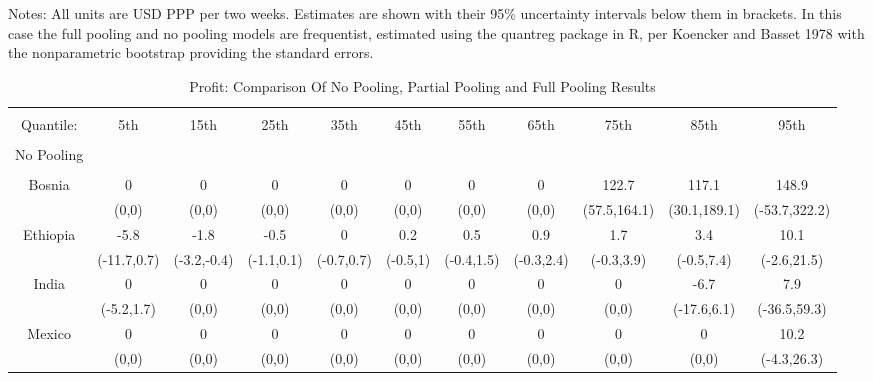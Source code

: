 \documentclass[AER]{AEA}
\begin{document}
\begin{landscape}
\begin{table}[!htbp]
\begin{tabular}{@{\extracolsep{5pt}} ccccccccccc}
\end{tabular}
\raggedright{\small Notes: All units are USD PPP per two weeks. Estimates are shown with their 95\% uncertainty intervals below them in brackets. In this case the full pooling and no pooling models are frequentist, estimated using the quantreg package in R, per Koencker and Basset 1978 with the nonparametric bootstrap providing the standard errors.}

\end{table}

\end{landscape}




\clearpage
\newpage
\singlespacing
\begin{landscape}
\begin{table}[!htbp] \centering
  \caption{Profit: Comparison Of No Pooling, Partial Pooling and Full Pooling Results}
  \label{big profit table}
  \tiny
\begin{tabular}{@{\extracolsep{5pt}} ccccccccccc}
\\[-1.8ex]\hline
\hline \\[-1.8ex]
 Quantile: & 5th & 15th & 25th & 35th & 45th & 55th & 65th & 75th & 85th & 95th \\
\hline \\[-1.8ex]
No Pooling &&&&&&&&&& \\
\hline \\[-1.8ex]
 Bosnia & 0 & 0 & 0 & 0 & 0 & 0 & 0 & 122.7 & 117.1 & 148.9 \\
& (0,0) & (0,0) & (0,0) & (0,0) & (0,0) & (0,0) & (0,0) & (57.5,164.1) & (30.1,189.1) & (-53.7,322.2) \\
 Ethiopia & -5.8 & -1.8 & -0.5 & 0 & 0.2 & 0.5 & 0.9 & 1.7 & 3.4 & 10.1 \\
& (-11.7,0.7) & (-3.2,-0.4) & (-1.1,0.1) & (-0.7,0.7) & (-0.5,1) & (-0.4,1.5) & (-0.3,2.4) & (-0.3,3.9) & (-0.5,7.4) & (-2.6,21.5) \\
 India & 0 & 0 & 0 & 0 & 0 & 0 & 0 & 0 & -6.7 & 7.9 \\
 & (-5.2,1.7) & (0,0) & (0,0) & (0,0) & (0,0) & (0,0) & (0,0) & (0,0) & (-17.6,6.1) & (-36.5,59.3) \\
 Mexico & 0 & 0 & 0 & 0 & 0 & 0 & 0 & 0 & 0 & 10.2 \\
 & (0,0) & (0,0) & (0,0) & (0,0) & (0,0) & (0,0) & (0,0) & (0,0) & (0,0) & (-4.3,26.3) \\

\end{tabular}
\end{table}
\end{landscape}
\end{document}
